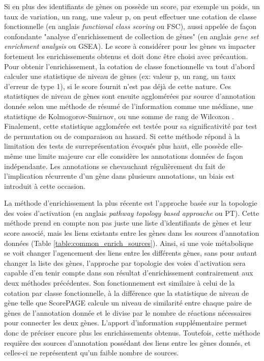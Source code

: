 Si en plus des identifiants de gènes on possède un score, par exemple un poids, un taux de variation, un rang, une valeur p, on peut effectuer une cotation de classe fonctionnelle (en anglais \textit{functional class scoring} ou FSC), aussi appelée de façon confondante "analyse d'enrichissement de collection de gènes" (en anglais \textit{gene set enrichment analysis} ou GSEA). Le score à considérer pour les gènes va impacter fortement les enrichissements obtenus \cite{Ackermann2009Dec} et doit donc être choisi avec précaution. Pour obtenir l'enrichissement, la cotation de classe fonctionnelle va tout d'abord calculer une statistique de niveau de gènes (ex: valeur p, un rang, un taux d'erreur de type 1), si le score fournit n'est pas déjà de cette nature. Ces statistiques de niveau de gènes sont ensuite agglomérées par source d'annotation donnée selon une méthode de résumé de l'information comme une médiane, une statistique de Kolmogorov-Smirnov, ou une somme de rang de Wilcoxon \cite{Khatri2012}. Finalement, cette statistique agglomérée est testée pour sa significativité par test de permutation ou de comparaison au hasard. Si cette méthode répond à la limitation des tests de surreprésentation évoqués plus haut, elle possède elle-même une limite majeure car elle considère les annotations données de façon indépendante. Les annotations se chevauchant régulièrement du fait de l'implication récurrente d'un gène dans plusieurs annotations, un biais est introduit à cette occasion.

La méthode d'enrichissement la plus récente est l'approche basée sur la topologie des voies d'activation (en anglais \textit{pathway topology based approache} ou PT). Cette méthode prend en compte non pas juste une liste d'identifiants de gènes et leur score associé, mais les liens existants entre les gènes dans les sources d'annotation données \cite{Khatri2012} (Table \ref{table:common_enrich_sources}). Ainsi, si une voie métabolique se voit changer l'agencement des liens entre les différents gènes, sans pour autant changer la liste des gènes, l'approche par topologie des voies d'activation sera capable d'en tenir compte dans son résultat d'enrichissement contrairement aux deux méthodes précédentes. Son fonctionnement est similaire à celui de la cotation par classe fonctionnelle, à la différence que la statistique de niveau de gène telle que ScorePAGE \cite{Rahnenfuhrer2004Jun} calcule un niveau de similarité entre chaque paire de gènes de l'annotation donnée et le divise par le nombre de réactions nécessaires pour connecter les deux gènes. L'apport d'information supplémentaire permet donc de préciser encore plus les enrichissements obtenus. Toutefois, cette méthode requière des sources d'annotation possédant des liens entre les gènes donnés, et celles-ci ne représentent qu'un faible nombre de sources.

